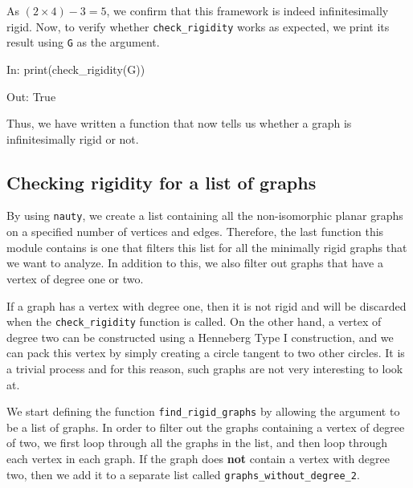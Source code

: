 \begin{flushleft}
As $(2 \times 4) - 3 = 5$, we confirm that this framework is indeed infinitesimally rigid. Now, to verify whether \texttt{check\_rigidity} works as expected, we print its result using \texttt{G} as the argument. 
\end{flushleft}

\begin{code}
    In: print(check_rigidity(G))

    Out: True
\end{code}

\begin{flushleft}
Thus, we have written a function that now tells us whether a graph is infinitesimally rigid or not.
\end{flushleft}

\subsection{Checking rigidity for a list of graphs}

\begin{flushleft}
By using \texttt{nauty}, we create a list containing all the non-isomorphic planar graphs on a specified number of vertices and edges. Therefore, the last function this module contains is one that filters this list for all the minimally rigid graphs that we want to analyze. In addition to this, we also filter out graphs that have a vertex of degree one or two. 
\end{flushleft}

\begin{flushleft}
If a graph has a vertex with degree one, then it is not rigid and will be discarded when the \texttt{check\_rigidity} function is called. On the other hand, a vertex of degree two can be constructed using a Henneberg Type I construction, and we can pack this vertex by simply creating a circle tangent to two other circles. It is a trivial process and for this reason, such graphs are not very interesting to look at.
\end{flushleft}

\begin{flushleft}
We start defining the function \texttt{find\_rigid\_graphs} by allowing the argument to be a list of graphs. In order to filter out the graphs containing a vertex of degree of two, we first loop through all the graphs in the list, and then loop through each vertex in each graph. If the graph does \textbf{not} contain a vertex with degree two, then we add it to a separate list called \texttt{graphs\_without\_degree\_2}. 
\end{flushleft}

